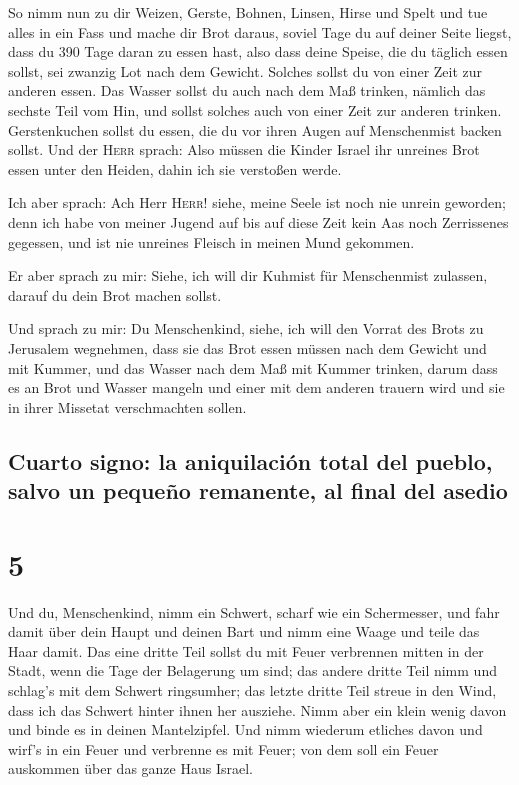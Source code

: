  So nimm nun zu dir Weizen, Gerste, Bohnen, Linsen, Hirse
und Spelt und tue alles in ein Fass und mache dir Brot daraus, soviel
Tage du auf deiner Seite liegst, dass du 390 Tage daran zu essen hast,
 also dass deine Speise, die du täglich essen sollst, sei
zwanzig Lot nach dem Gewicht. Solches sollst du von einer Zeit zur
anderen essen.  Das Wasser sollst du auch nach dem Maß
trinken, nämlich das sechste Teil vom Hin, und sollst solches auch von
einer Zeit zur anderen trinken.  Gerstenkuchen sollst du
essen, die du vor ihren Augen auf Menschenmist backen sollst.
 Und der \textsc{Herr} sprach: Also müssen die Kinder
Israel ihr unreines Brot essen unter den Heiden, dahin ich sie verstoßen
werde.

 Ich aber sprach: Ach Herr \textsc{Herr}! siehe, meine
Seele ist noch nie unrein geworden; denn ich habe von meiner Jugend auf
bis auf diese Zeit kein Aas noch Zerrissenes gegessen, und ist nie
unreines Fleisch in meinen Mund gekommen.

 Er aber sprach zu mir: Siehe, ich will dir Kuhmist für
Menschenmist zulassen, darauf du dein Brot machen sollst.

 Und sprach zu mir: Du Menschenkind, siehe, ich will den
Vorrat des Brots zu Jerusalem wegnehmen, dass sie das Brot essen müssen
nach dem Gewicht und mit Kummer, und das Wasser nach dem Maß mit Kummer
trinken,  darum dass es an Brot und Wasser mangeln und
einer mit dem anderen trauern wird und sie in ihrer Missetat
verschmachten sollen.

\hypertarget{cuarto-signo-la-aniquilaciuxf3n-total-del-pueblo-salvo-un-pequeuxf1o-remanente-al-final-del-asedio}{%
\subsection{Cuarto signo: la aniquilación total del pueblo, salvo un
pequeño remanente, al final del
asedio}\label{cuarto-signo-la-aniquilaciuxf3n-total-del-pueblo-salvo-un-pequeuxf1o-remanente-al-final-del-asedio}}

\hypertarget{section-4}{%
\section{5}\label{section-4}}

 Und du, Menschenkind, nimm ein Schwert, scharf wie ein
Schermesser, und fahr damit über dein Haupt und deinen Bart und nimm
eine Waage und teile das Haar damit.  Das eine dritte Teil
sollst du mit Feuer verbrennen mitten in der Stadt, wenn die Tage der
Belagerung um sind; das andere dritte Teil nimm und schlag's mit dem
Schwert ringsumher; das letzte dritte Teil streue in den Wind, dass ich
das Schwert hinter ihnen her ausziehe.  Nimm aber ein
klein wenig davon und binde es in deinen Mantelzipfel. 
Und nimm wiederum etliches davon und wirf's in ein Feuer und verbrenne
es mit Feuer; von dem soll ein Feuer auskommen über das ganze Haus
Israel.

